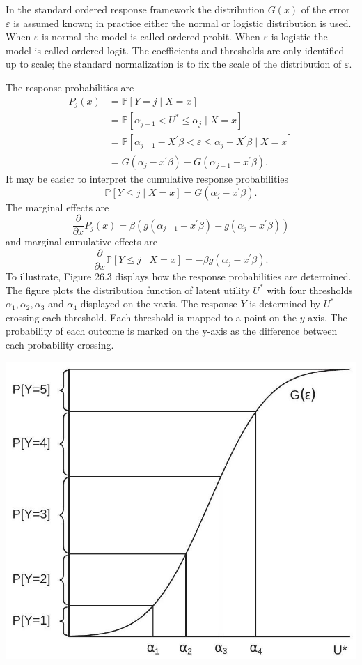\documentclass[10pt]{article}
\begin{document}
In the standard ordered response framework the distribution $G(x)$ of the error $\varepsilon$ is assumed known; in practice either the normal or logistic distribution is used. When $\varepsilon$ is normal the model is called ordered probit. When $\varepsilon$ is logistic the model is called ordered logit. The coefficients and thresholds are only identified up to scale; the standard normalization is to fix the scale of the distribution of $\varepsilon$.

The response probabilities are
$$
\begin{aligned}
P_{j}(x) &=\mathbb{P}[Y=j \mid X=x] \\
&=\mathbb{P}\left[\alpha_{j-1}<U^{*} \leq \alpha_{j} \mid X=x\right] \\
&=\mathbb{P}\left[\alpha_{j-1}-X^{\prime} \beta<\varepsilon \leq \alpha_{j}-X^{\prime} \beta \mid X=x\right] \\
&=G\left(\alpha_{j}-x^{\prime} \beta\right)-G\left(\alpha_{j-1}-x^{\prime} \beta\right) .
\end{aligned}
$$
It may be easier to interpret the cumulative response probabilities
$$
\mathbb{P}[Y \leq j \mid X=x]=G\left(\alpha_{j}-x^{\prime} \beta\right) .
$$
The marginal effects are
$$
\frac{\partial}{\partial x} P_{j}(x)=\beta\left(g\left(\alpha_{j-1}-x^{\prime} \beta\right)-g\left(\alpha_{j}-x^{\prime} \beta\right)\right)
$$
and marginal cumulative effects are
$$
\frac{\partial}{\partial x} \mathbb{P}[Y \leq j \mid X=x]=-\beta g\left(\alpha_{j}-x^{\prime} \beta\right) .
$$
To illustrate, Figure $26.3$ displays how the response probabilities are determined. The figure plots the distribution function of latent utility $U^{*}$ with four thresholds $\alpha_{1}, \alpha_{2}, \alpha_{3}$ and $\alpha_{4}$ displayed on the xaxis. The response $Y$ is determined by $U^{*}$ crossing each threshold. Each threshold is mapped to a point on the $y$-axis. The probability of each outcome is marked on the y-axis as the difference between each probability crossing.

\includegraphics[max width=\textwidth]{2022_10_23_114e68a1ccdd7fb263a3g-17}
\end{document}
